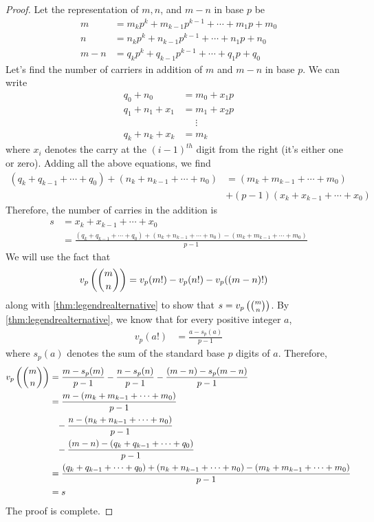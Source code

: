 \begin{proof}
Let the representation of $m, n$, and $m-n$ in base $p$ be
\begin{align*}
	m   &= m_kp^k+m_{k-1}p^{k-1}+\cdots +m_1p+m_0\\
	n   &= n_kp^k+n_{k-1}p^{k-1}+\cdots +n_1p+n_0\\
	m-n &= q_kp^k+q_{k-1}p^{k-1}+\cdots +q_1p+q_0
\end{align*}
Let's find the number of carriers in addition of $m$ and $m-n$ in base $p$. We can write
\begin{align*}
	q_0+n_0  &= m_0 + x_1 p\\
	q_1+n_1+x_1&= m_1 + x_2p\\
	&\phantom{=}\vdots\\
	q_k+n_k+x_k&= m_k
\end{align*}
where $x_i$ denotes the carry at the $(i-1)^{th}$ digit from the right (it's either one or zero). Adding all the above equations, we find
\begin{align*}
	(q_k+q_{k-1}+\cdots+q_0)+(n_k+n_{k-1}+\cdots+n_0) &= (m_k+m_{k-1}+ \cdots+m_0)\\&+(p-1)(x_k+x_{k-1}+\cdots+x_0)
\end{align*}
Therefore, the number of carries in the addition is
\begin{align*}
	s &= x_k+x_{k-1}+\cdots+x_0 \\
	&= \frac{(q_k+q_{k-1}+\cdots+q_0) + (n_k+n_{k-1}+\cdots+n_0) - (m_k+m_{k-1}+\cdots+m_0)}{p-1}
\end{align*}
We will use the fact that
\begin{align*}
	v_{p}\left(\binom{m}{n}\right) &= v_p(m!)-v_p(n!)-v_p((m-n)!)
\end{align*}
along with \autoref{thm:legendrealternative} to show that $s=v_{p}\left(\binom{m}{n}\right)$. By \autoref{thm:legendrealternative}, we know that for every positive integer $a$,
\begin{align*}
	v_p(a!) & =\frac{a-s_p(a)}{p-1}
\end{align*}
where $s_p(a)$ denotes the sum of the standard base $p$ digits of $a$. Therefore,
\begin{align*}
	v_{p}\left(\binom{m}{n}\right)
	& = \frac{m-s_p(m)}{p-1}-\frac{n-s_p(n)}{p-1}-\frac{(m-n)-s_p(m-n)}{p-1}\\
	& = \frac{m-(m_k+m_{k-1}+\cdots+m_0)}{p-1}\\
	& \phantom{=}-\frac{n-(n_k+n_{k-1}+\cdots+n_0)}{p-1}\\
	& \phantom{=}-\frac{(m-n)-(q_k+q_{k-1}+\cdots+q_0)}{p-1}\\
	& = \frac{(q_k+q_{k-1}+\cdots+q_0) + (n_k+n_{k-1}+\cdots+n_0) - (m_k+m_{k-1}+\cdots+m_0)}{p-1}\\
	&=s
\end{align*}
The proof is complete.
\end{proof}

